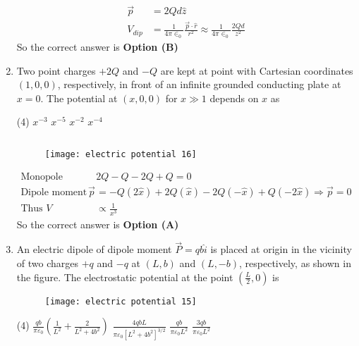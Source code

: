 \begin{enumerate}
\begin{answer}
\begin{align*}
		\vec{p}&=2 Q d \hat{z}\\
		V_{d i p}&=\frac{1}{4 \pi \in_{0}} \frac{\vec{p} \cdot \hat{r}}{r^{2}} \approx \frac{1}{4 \pi \in_{0}} \frac{2 Q d}{z^{2}}
		\end{align*}
		So the correct answer is \textbf{Option (B)}
	\end{answer}
	\item  Two point charges $+2 Q$ and $-Q$ are kept at point with Cartesian coordinates $(1,0,0)$, respectively, in front of an infinite grounded conducting plate at $x=0$. The potential at $(x, 0,0)$ for $x \gg 1$ depends on $x$ as
	{}
	\begin{tasks}(4)
		\task[\textbf{A.}] $x^{-3}$
		\task[\textbf{B.}]  $x^{-5}$
		\task[\textbf{C.}] $x^{-2}$
		\task[\textbf{D.}] $x^{-4}$
	\end{tasks}
	\begin{answer}$\left. \right. $
		\begin{figure}[H]
			\centering
			\texttt{[image: electric potential 16]}
		\end{figure}
		\begin{align*}
		\text{Monopole moment }&2 Q-Q-2 Q+Q=0\\
		\text{Dipole moment }\vec{p}&=-Q(2 \hat{x})+2 Q(\hat{x})-2 Q(-\hat{x})+Q(-2 \hat{x}) \Rightarrow \vec{p}=0\\
		\text{Thus }V &\propto \frac{1}{x^{3}}
		\end{align*}
		So the correct answer is \textbf{Option (A)}
	\end{answer}
	\item An electric dipole of dipole moment $\vec{P}=q b \hat{i}$ is placed at origin in the vicinity of two charges $+q$ and $-q$ at $(L, b)$ and $(L,-b)$, respectively, as shown in the figure. The electrostatic potential at the point $\left(\frac{L}{2}, 0\right)$ is
	{}
	\begin{figure}[H]
		\centering
		\texttt{[image: electric potential 15]}
	\end{figure}
	\begin{tasks}(4)
		\task[\textbf{A.}] $\frac{q b}{\pi \varepsilon_{0}}\left(\frac{1}{L^{2}}+\frac{2}{L^{2}+4 b^{2}}\right)$
		\task[\textbf{B.}] $\frac{4 q b L}{\pi \varepsilon_{0}\left[L^{2}+4 b^{2}\right]^{3 / 2}}$
		\task[\textbf{C.}] $\frac{q b}{\pi \varepsilon_{0} L^{2}}$
		\task[\textbf{D.}] $\frac{3 q b}{\pi \varepsilon_{0} L^{2}}$
	\end{tasks}

\end{enumerate}
